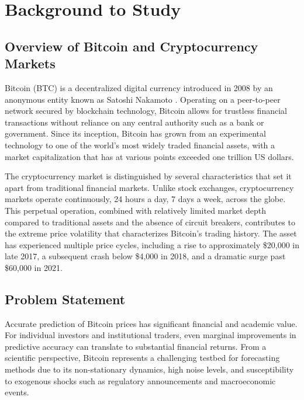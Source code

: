 \documentclass[12pt]{article}
\begin{document}
\section{Background to Study}

\subsection{Overview of Bitcoin and Cryptocurrency Markets}

Bitcoin (BTC) is a decentralized digital currency introduced in 2008 by an anonymous entity known as Satoshi Nakamoto \cite{nakamoto2008}. Operating on a peer-to-peer network secured by blockchain technology, Bitcoin allows for trustless financial transactions without reliance on any central authority such as a bank or government. Since its inception, Bitcoin has grown from an experimental technology to one of the world's most widely traded financial assets, with a market capitalization that has at various points exceeded one trillion US dollars.

The cryptocurrency market is distinguished by several characteristics that set it apart from traditional financial markets. Unlike stock exchanges, cryptocurrency markets operate continuously, 24 hours a day, 7 days a week, across the globe. This perpetual operation, combined with relatively limited market depth compared to traditional assets and the absence of circuit breakers, contributes to the extreme price volatility that characterizes Bitcoin's trading history. The asset has experienced multiple price cycles, including a rise to approximately \$20,000 in late 2017, a subsequent crash below \$4,000 in 2018, and a dramatic surge past \$60,000 in 2021.

\subsection{Problem Statement}

Accurate prediction of Bitcoin prices has significant financial and academic value. For individual investors and institutional traders, even marginal improvements in predictive accuracy can translate to substantial financial returns. From a scientific perspective, Bitcoin represents a challenging testbed for forecasting methods due to its non-stationary dynamics, high noise levels, and susceptibility to exogenous shocks such as regulatory announcements and macroeconomic events.
\end{document}
